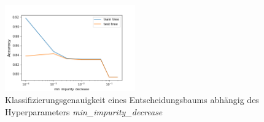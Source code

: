 \begin{figure}[ht]
	\centering
	\includegraphics[width = 0.5\textwidth]{Bilder/min_impurity_decrease.png}
	\caption{Klassifizierungsgenauigkeit eines Entscheidungsbaums abhängig des Hyperparameters \emph{min\_impurity\_decrease}}
	\label{fig:grid_search_impurity_decrease}
\end{figure}


